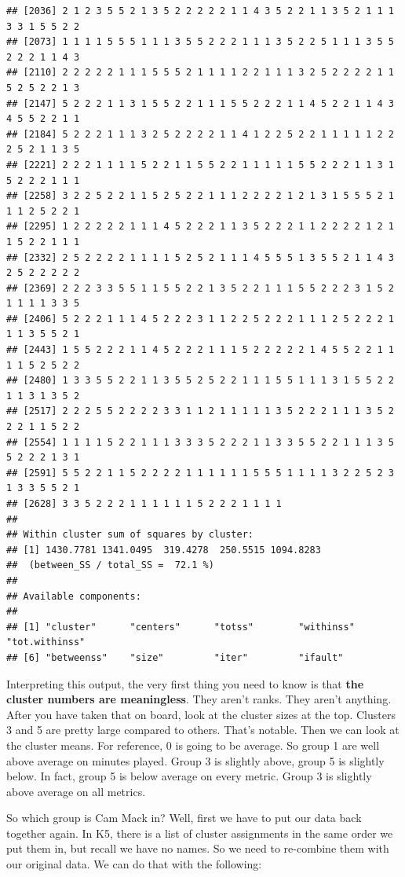 \documentclass[]{book}
\begin{document}
\begin{verbatim}
## [2036] 2 1 2 3 5 5 2 1 3 5 2 2 2 2 2 1 1 4 3 5 2 2 1 1 3 5 2 1 1 1 3 3 1 5 5 2 2
## [2073] 1 1 1 1 5 5 5 1 1 1 3 5 5 2 2 2 1 1 1 3 5 2 2 5 1 1 1 3 5 5 2 2 2 1 1 4 3
## [2110] 2 2 2 2 2 1 1 1 5 5 5 2 1 1 1 1 2 2 1 1 1 3 2 5 2 2 2 2 1 1 5 2 5 2 2 1 3
## [2147] 5 2 2 2 1 1 3 1 5 5 2 2 1 1 1 5 5 2 2 2 1 1 4 5 2 2 1 1 4 3 4 5 5 2 2 1 1
## [2184] 5 2 2 2 1 1 1 3 2 5 2 2 2 2 1 1 4 1 2 2 5 2 2 1 1 1 1 1 2 2 2 5 2 1 1 3 5
## [2221] 2 2 2 1 1 1 1 5 2 2 1 1 5 5 2 2 1 1 1 1 1 5 5 2 2 2 1 1 3 1 5 2 2 2 1 1 1
## [2258] 3 2 2 5 2 2 1 1 5 2 5 2 2 1 1 1 2 2 2 2 1 2 1 3 1 5 5 5 2 1 1 1 2 5 2 2 1
## [2295] 1 2 2 2 2 2 1 1 1 4 5 2 2 2 1 1 3 5 2 2 2 1 1 2 2 2 2 1 2 1 1 5 2 2 1 1 1
## [2332] 2 5 2 2 2 2 1 1 1 1 5 2 5 2 1 1 1 4 5 5 5 1 3 5 5 2 1 1 4 3 2 5 2 2 2 2 2
## [2369] 2 2 2 3 3 5 5 1 1 5 5 2 2 1 3 5 2 2 1 1 1 5 5 2 2 2 3 1 5 2 1 1 1 1 3 3 5
## [2406] 5 2 2 2 1 1 1 4 5 2 2 2 3 1 1 2 2 5 2 2 2 1 1 1 2 5 2 2 2 1 1 1 3 5 5 2 1
## [2443] 1 5 5 2 2 2 1 1 4 5 2 2 2 1 1 1 5 2 2 2 2 2 1 4 5 5 2 2 1 1 1 1 5 2 5 2 2
## [2480] 1 3 3 5 5 2 2 1 1 3 5 5 2 5 2 2 1 1 1 5 5 1 1 1 3 1 5 5 2 2 1 1 3 1 3 5 2
## [2517] 2 2 2 5 5 2 2 2 2 3 3 1 1 2 1 1 1 1 1 3 5 2 2 2 1 1 1 3 5 2 2 2 1 1 5 2 2
## [2554] 1 1 1 1 5 2 2 1 1 1 3 3 3 5 2 2 2 1 1 3 3 5 5 2 2 1 1 1 3 5 5 2 2 2 1 3 1
## [2591] 5 5 2 2 1 1 5 2 2 2 2 1 1 1 1 1 1 5 5 5 1 1 1 1 3 2 2 5 2 3 1 3 3 5 5 2 1
## [2628] 3 3 5 2 2 2 1 1 1 1 1 1 5 2 2 2 1 1 1 1
## 
## Within cluster sum of squares by cluster:
## [1] 1430.7781 1341.0495  319.4278  250.5515 1094.8283
##  (between_SS / total_SS =  72.1 %)
## 
## Available components:
## 
## [1] "cluster"      "centers"      "totss"        "withinss"     "tot.withinss"
## [6] "betweenss"    "size"         "iter"         "ifault"
\end{verbatim}

Interpreting this output, the very first thing you need to know is that \textbf{the cluster numbers are meaningless}. They aren't ranks. They aren't anything. After you have taken that on board, look at the cluster sizes at the top. Clusters 3 and 5 are pretty large compared to others. That's notable. Then we can look at the cluster means. For reference, 0 is going to be average. So group 1 are well above average on minutes played. Group 3 is slightly above, group 5 is slightly below. In fact, group 5 is below average on every metric. Group 3 is slightly above average on all metrics.

So which group is Cam Mack in? Well, first we have to put our data back together again. In K5, there is a list of cluster assignments in the same order we put them in, but recall we have no names. So we need to re-combine them with our original data. We can do that with the following:
\end{document}
